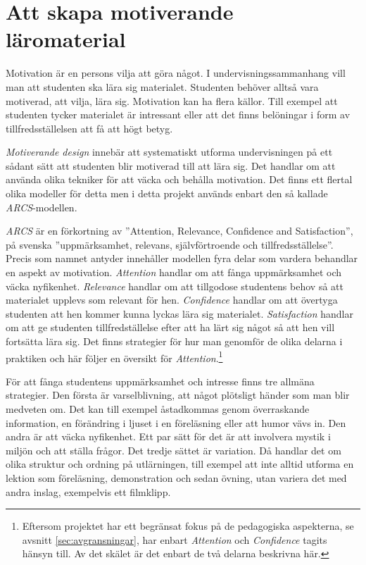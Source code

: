 \section{Att skapa motiverande läromaterial}
\label{sec:arcs}
\begin{draft}

Motivation är en persons vilja att göra något. I undervisningssammanhang vill man att studenten ska lära sig materialet. Studenten behöver alltså vara motiverad, att vilja, lära sig. Motivation kan ha flera källor. Till exempel att studenten tycker materialet är intressant eller att det finns belöningar i form av tillfredsställelsen att få att högt betyg. 

\textit{Motiverande design} innebär att systematiskt utforma undervisningen på ett sådant sätt att studenten blir motiverad till att lära sig. Det handlar om att använda olika tekniker för att väcka och behålla motivation. Det finns ett flertal olika modeller för detta men i detta projekt används enbart den så kallade \textit{ARCS}-modellen.\cite{arcs_book}

\textit{ARCS} är en förkortning av ''Attention, Relevance, Confidence and Satisfaction'', på svenska ''uppmärksamhet, relevans, självförtroende och tillfredsställelse''. Precis som namnet antyder innehåller modellen fyra delar som vardera behandlar en aspekt av motivation. \textit{Attention} handlar om att fånga uppmärksamhet och väcka nyfikenhet. \textit{Relevance} handlar om att tillgodose studentens behov så att materialet upplevs som relevant för hen. \textit{Confidence} handlar om att övertyga studenten att hen kommer kunna lyckas lära sig materialet. \textit{Satisfaction} handlar om att ge studenten tillfredställelse efter att ha lärt sig något så att hen vill fortsätta lära sig. Det finns strategier för hur man genomför de olika delarna i praktiken och här följer en översikt för \textit{Attention}.\footnote{Eftersom projektet har ett begränsat fokus på de pedagogiska aspekterna, se avsnitt \ref{sec:avgransningar}, har enbart \textit{Attention} och \textit{Confidence} tagits hänsyn till. Av det skälet är det enbart de två delarna beskrivna här.}

För att fånga studentens uppmärksamhet och intresse finns tre allmäna strategier. Den första är varselblivning, att något plötsligt händer som man blir medveten om. Det kan till exempel åstadkommas genom överraskande information, en förändring i ljuset i en föreläsning eller att humor vävs in. Den andra är att väcka nyfikenhet. Ett par sätt för det är att involvera mystik i miljön och att ställa frågor. Det tredje sättet är variation. Då handlar det om olika struktur och ordning på utlärningen, till exempel att inte alltid utforma en lektion som föreläsning, demonstration och sedan övning, utan variera det med andra inslag, exempelvis ett filmklipp.



\end{draft}
